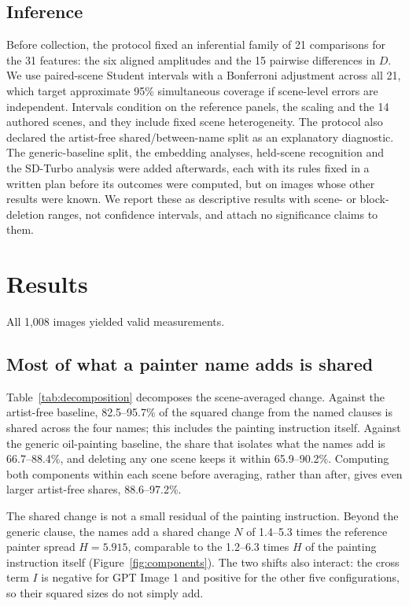 \documentclass[10pt]{article}
\begin{document}
\subsection{Inference}

Before collection, the protocol fixed an inferential family of 21 comparisons for
the 31 features: the six aligned amplitudes and the 15 pairwise differences in $D$.
We use paired-scene Student intervals with a Bonferroni adjustment across all 21,
which target approximate 95\% simultaneous coverage if scene-level errors are
independent. Intervals condition on the reference panels, the scaling and the 14
authored scenes, and they include fixed scene heterogeneity. The protocol also
declared the artist-free shared/between-name split as an explanatory diagnostic.
The generic-baseline split, the embedding analyses, held-scene recognition and the
SD-Turbo analysis were added afterwards, each with its rules fixed in a written plan
before its outcomes were computed, but on images whose other results were known. We
report these as descriptive results with scene- or block-deletion ranges, not
confidence intervals, and attach no significance claims to them.

\section{Results}\label{sec:results}

All 1,008 images yielded valid measurements.

\subsection{Most of what a painter name adds is shared}\label{sec:shared}



Table~\ref{tab:decomposition} decomposes the scene-averaged change. Against the
artist-free baseline, 82.5--95.7\% of the squared change from the named clauses is
shared across the four names; this includes the painting instruction itself.
Against the generic oil-painting baseline, the share that isolates what the names
add is 66.7--88.4\%, and deleting any one scene keeps it within 65.9--90.2\%.
Computing both components within each scene before averaging, rather than after,
gives even larger artist-free shares, 88.6--97.2\%.

The shared change is not a small residual of the painting instruction. Beyond the
generic clause, the names add a shared change $N$ of 1.4--5.3 times the reference
painter spread $H=5.915$, comparable to the 1.2--6.3 times $H$ of the painting
instruction itself (Figure~\ref{fig:components}). The two shifts also interact: the
cross term $I$ is negative for GPT Image 1 and positive for the other five
configurations, so their squared sizes do not simply add.
\end{document}
